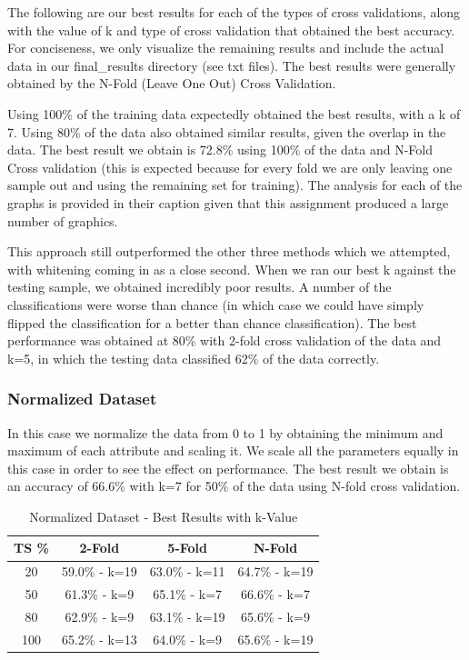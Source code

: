 \documentclass[conference]{acmsiggraph}
\begin{document}
The following are our best results for each of the types of cross validations, along with the value of k and type of cross validation that obtained the best accuracy. For conciseness, we only visualize the remaining results and include the actual data in our final\_results directory (see txt files). The best results were generally obtained by the N-Fold (Leave One Out) Cross Validation. 

Using 100\% of the training data expectedly obtained the best results, with a k of 7. Using 80\% of the data also obtained similar results, given the overlap in the data. The best result we obtain is 72.8\% using 100\% of the data and N-Fold Cross validation (this is expected because for every fold we are only leaving one sample out and using the remaining set for training). The analysis for each of the graphs is provided in their caption given that this assignment produced a large number of graphics.

This approach still outperformed the other three methods which we attempted, with whitening coming in as a close second. When we ran our best k against the testing sample, we obtained incredibly poor results. A number of the classifications were worse than chance (in which case we could have simply flipped the classification for a better than chance classification). The best performance was obtained at 80\% with 2-fold cross validation of the data and k=5, in which the testing data classified 62\% of the data correctly.

\subsubsection{Normalized Dataset}
In this case we normalize the data from 0 to 1 by obtaining the minimum and maximum of each attribute and scaling it. We scale all the parameters equally in this case in order to see the effect on performance. The best result we obtain is an accuracy of 66.6\% with k=7 for 50\% of the data using N-fold cross validation.
\begin{table}[h]
\caption{Normalized Dataset - Best Results with k-Value}
\centering
\begin{tabular}{c c c c}
\hline\hline
TS \% & 2-Fold & 5-Fold & N-Fold \\ [0.5ex]
\hline
20 & 59.0\% - k=19 & 63.0\% - k=11 & 64.7\% - k=19 \\
50 & 61.3\% - k=9 & 65.1\% - k=7 & 66.6\% - k=7 \\
80 & 62.9\% - k=9 & 63.1\% - k=19 & 65.6\% - k=9 \\
100 & 65.2\% - k=13 & 64.0\% - k=9 & 65.6\% - k=19 \\
\hline
\end{tabular}
\label{alc_n_res_table}
\end{table}
\end{document}
